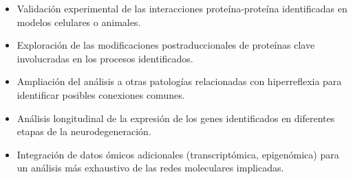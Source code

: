 \begin{itemize}
	\item Validación experimental de las interacciones proteína-proteína identificadas en modelos celulares o animales.
	\item Exploración de las modificaciones postraduccionales de proteínas clave involucradas en los procesos identificados.
	\item Ampliación del análisis a otras patologías relacionadas con hiperreflexia para identificar posibles conexiones comunes.
	\item Análisis longitudinal de la expresión de los genes identificados en diferentes etapas de la neurodegeneración.
	\item Integración de datos ómicos adicionales (transcriptómica, epigenómica) para un análisis más exhaustivo de las redes moleculares implicadas.
\end{itemize}

